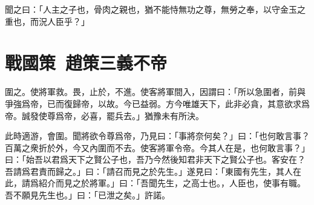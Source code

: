 聞之曰：「人主之子也，骨肉之親也，猶不能恃無功之尊，無勞之奉，以守金玉之重也，而況人臣乎？」

\section[魯仲連義不帝秦\quad{\small 戰國策\ 趙策三}]{{\normalsize 戰國策\ 趙策三}\quad {}義不帝}
圍之。使將軍救。畏，止於，不進。使客將軍間入，因謂曰：「所以急圍者，前與爭強爲帝，已而復歸帝，以故。今已益弱。方今唯雄天下，此非必貪，其意欲求爲帝。誠發使尊爲帝，必喜，罷兵去。」猶豫未有所決。

此時適游，會圍。聞將欲令尊爲帝，乃見曰：「事將奈何矣？」曰：「也何敢言事？百萬之衆折於外，今又內圍而不去。使客將軍令帝。今其人在是，也何敢言事？」曰：「始吾以君爲天下之賢公子也，吾乃今然後知君非天下之賢公子也。客安在？吾請爲君責而歸之。」曰：「請召而見之於先生。」遂見曰：「東國有先生，其人在此，請爲紹介而見之於將軍。」曰：「吾聞先生，之高士也。，人臣也，使事有職。吾不願見先生也。」曰：「已泄之矣。」許諾。

